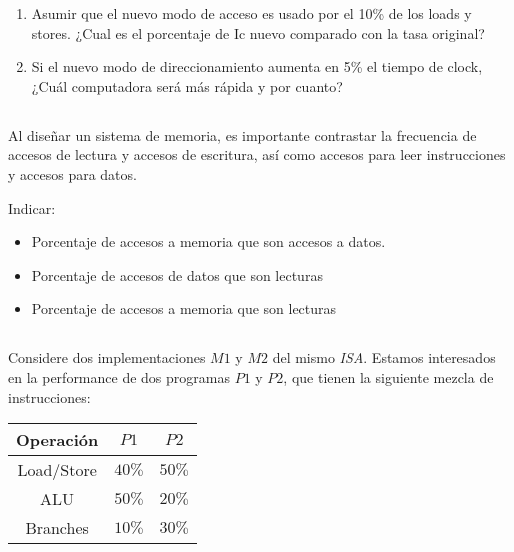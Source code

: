			\begin{enumerate}[label=\alph*)]
			 \item Asumir que el nuevo modo de acceso es usado por el 10\% de los loads y stores. ¿Cual es el porcentaje de Ic nuevo comparado con la tasa original?
            \item Si el nuevo modo de direccionamiento aumenta en 5\% el tiempo de clock, ¿Cuál
			       computadora será más rápida y por cuanto?
			\end{enumerate}

\subsection {}
            Al diseñar un sistema de memoria, es importante contrastar la frecuencia de accesos de lectura y accesos de escritura, así como
            accesos para leer instrucciones y accesos para datos.

            Indicar: 
            \begin{itemize}
            \item Porcentaje de accesos a memoria que son accesos a datos.
            \item Porcentaje de accesos de datos que son lecturas  
            \item Porcentaje de accesos a memoria que son lecturas
            \end{itemize}

\subsection{}
            Considere dos implementaciones $M1$ y $M2$ del mismo \textit{ISA}. Estamos interesados en la performance de dos programas $P1$ y $P2$, que tienen 
            la siguiente mezcla de instrucciones: 
            
            \begin{center}
            \begin{tabular}{||c|c|c||}
            \hline
            Operación & $P1$ & $P2$ \\
            \hline
            Load/Store & $40\%$ & $50\%$ \\
            \hline
            ALU        & $50\%$ & $20\%$ \\
            \hline
            Branches   & $10\%$ & $30\%$ \\
            \hline
            \end{tabular}
            \end{center}

